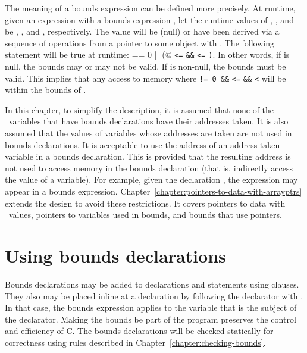 The meaning of a bounds expression can be defined more precisely. At
runtime, given an expression  with a bounds expression
, let the runtime
values of , , and  be , ,
and , respectively. The value  will be  (null) or
have been derived via a sequence of operations from a pointer to some
object  with .
The following statement will be true at runtime:
 \lstinline@== 0 || (@ \lstinline|<=|  \lstinline|&&|
 \lstinline|<=| \lstinline|)|. In other words,
if  is null, the bounds
may or may not be valid. If  is non-null, the bounds must be
valid. This implies that any access to memory where 
\lstinline|!= 0 &&|  \lstinline|<=|  \lstinline|&&| 
\lstinline|<|  will be within the bounds of .

In this chapter, to simplify the description, it is assumed that none of
the \arrayptr\ variables that have bounds declarations have
their addresses taken. It is also assumed that the values of variables
whose addresses are taken are not used in bounds declarations. It is
acceptable to use the address of an address-taken variable in a bounds
declaration. This is provided that the resulting address is not used to
access memory in the bounds declaration (that is, indirectly access the
value of a variable). For example, given the declaration ,
the expression  may appear in a bounds expression.
Chapter~\ref{chapter:pointers-to-data-with-arrayptrs} extends the
design to avoid these restrictions.  It covers pointers to data with
\arrayptr\ values,  pointers to variables used in bounds, and bounds
that use pointers.

\section{Using bounds declarations}

Bounds declarations may be added to declarations and statements using
 clauses. They also may be placed inline at a declaration
by following the declarator with \code{:} . In that
case, the bounds expression applies to the variable that is the subject
of the declarator. Making the bounds be part of the program preserves the
control and efficiency of C. The bounds declarations will be checked statically
for correctness using rules described in
Chapter~\ref{chapter:checking-bounds}.


